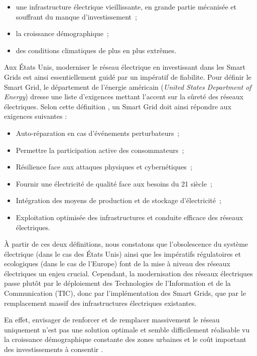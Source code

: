 \begin{itemize}
    \item une infrastructure électrique vieillissante, en grande partie
    mécanisée et souffrant du manque d'investissement~;
    \item la croissance démographique~;
    \item des conditions climatiques de plus en plus extrêmes.
\end{itemize}

Aux États Unis, moderniser le réseau électrique en investissant dans les Smart 
Grids est ainsi essentiellement guidé par un impératif de fiabilite. Pour 
définir le Smart Grid, le département de l'énergie américain (\textit{United 
States Department of Energy}) dresse une liste d'exigences mettant l'accent sur 
la sûreté des réseaux électriques. Selon cette définition \cite{USDE}, un Smart 
Grid doit ainsi répondre aux exigences suivantes :

\begin{itemize}
\item Auto-réparation en cas d'événements perturbateurs~;
\item Permettre la participation active des consommateurs~; 
\item Résilience face aux attaques physiques et cybernétiques~;
\item Fournir une électricité de qualité face aux besoins du 21 siècle~;
\item Intégration des moyens de production et de stockage d'électricité~;
\item Exploitation optimisée des infrastructures et conduite efficace des 
réseaux électriques.
\end{itemize} 

À partir de ces deux définitions, nous constatons que l'obsolescence du système 
électrique (dans le cas des États Unis) ainsi que les impératifs régulatoires et 
ecologiques (dans le cas de l'Europe) font de la mise à niveau des réseaux 
électriques un enjeu crucial. Cependant, la modernisation des réseaux 
électriques passe plutôt par le déploiement des Technologies de l'Information et 
de la Communication (TIC), donc par l'implémentation des Smart Grids, que par le 
remplacement massif des infrastructures électriques existantes.

En effet, envisager de renforcer et de remplacer massivement le réseau 
uniquement n'est pas une solution optimale et semble difficilement réalisable vu 
la croissance démographique constante des zones urbaines et le coût important 
des investissements à consentir \cite{cre}.

